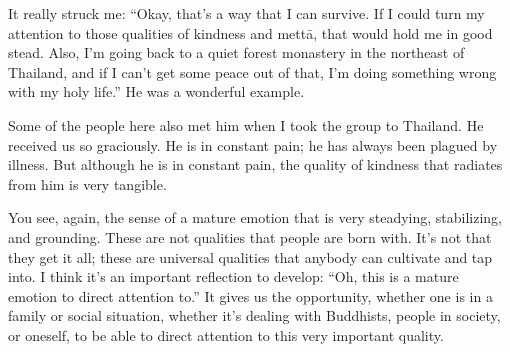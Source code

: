 It really struck me: “Okay, that’s a way that I can survive. If I could
turn my attention to those qualities of kindness and mettā, that would
hold me in good stead. Also, I’m going back to a quiet forest monastery
in the northeast of Thailand, and if I can’t get some peace out of that,
I’m doing something wrong with my holy life.” He was a wonderful
example.

Some of the people here also met him when I took the group to Thailand.
He received us so graciously. He is in constant pain; he has always been
plagued by illness. But although he is in constant pain, the quality of
kindness that radiates from him is very tangible.

You see, again, the sense of a mature emotion that is very steadying,
stabilizing, and grounding. These are not qualities that people are born
with. It’s not that they get it all; these are universal qualities that
anybody can cultivate and tap into. I think it’s an important reflection
to develop: “Oh, this is a mature emotion to direct attention to.” It
gives us the opportunity, whether one is in a family or social
situation, whether it’s dealing with Buddhists, people in society, or
oneself, to be able to direct attention to this very important quality.
